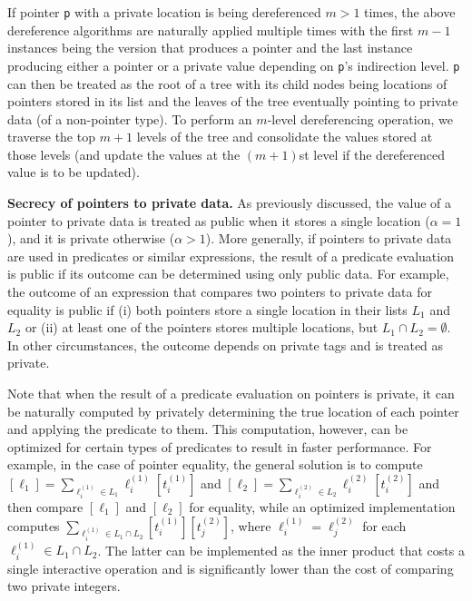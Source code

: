 \documentclass[11pt]{article}
\begin{document}
If pointer \texttt{p} with a private location is being dereferenced $m > 1$
times, the above dereference algorithms are naturally applied multiple times
with the first $m-1$ instances being the version that produces a pointer and
the last instance producing either a pointer or a private value depending on
\texttt{p}'s indirection level. \texttt{p} can then be treated as the root
of a tree with its child nodes being locations of pointers stored in its
list and the leaves of the tree eventually pointing to private data (of a
non-pointer type). To perform an $m$-level dereferencing operation, we
traverse the top $m+1$ levels of the tree and consolidate the values stored
at those levels (and update the values at the $(m+1)$st level if the
dereferenced value is to be updated). 

\medskip \noindent \textbf{Secrecy of pointers to private data.} As previously
discussed, the value of a pointer to private data is treated as public when
it stores a single location ($\alpha = 1$), and it is private otherwise
($\alpha > 1$). More generally, if pointers to private data are used in
predicates or similar expressions, the result of a predicate evaluation is
public if its outcome can be determined using only public data. For example,
the outcome of an expression that compares two pointers to private data for
equality is public if (i) both pointers store a single location in their
lists $L_1$ and $L_2$ or (ii) at least one of the pointers stores multiple
locations, but $L_1 \cap L_2 = \emptyset$. In other circumstances, the
outcome depends on private tags and is treated as private.

Note that when the result of a predicate evaluation on pointers is private,
it can be naturally computed by privately determining the true location of
each pointer and applying the predicate to them. This computation, however,
can be optimized for certain types of predicates to result in faster
performance. For example, in the case of pointer equality, the general
solution is to compute $[\ell_1] = \sum_{\ell^{(1)}_i \in L_1} \ell^{(1)}_i
[t^{(1)}_i]$ and $[\ell_2] = \sum_{\ell^{(2)}_i \in L_2} \ell^{(2)}_i
[t^{(2)}_i]$ and then compare $[\ell_1]$ and $[\ell_2]$ for equality, while
an optimized implementation computes $\sum_{\ell^{(1)}_i \in L_1 \cap L_2}
[t^{(1)}_i] [t^{(2)}_j]$, where $\ell^{(1)}_i = \ell^{(2)}_j$ for each
$\ell^{(1)}_i \in L_1 \cap L_2$. The latter can be implemented as the inner
product that costs a single interactive operation and is significantly lower
than the cost of comparing two private integers.
\end{document}
